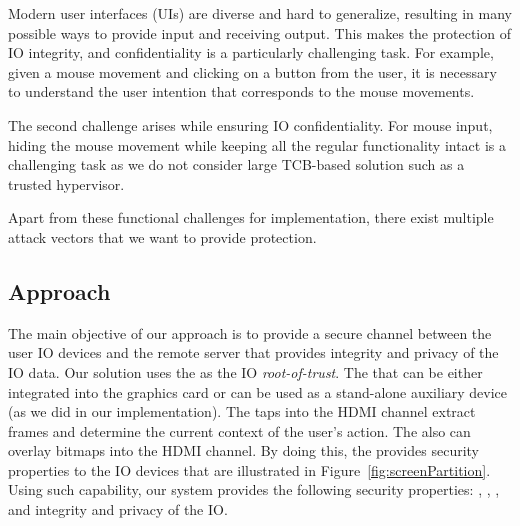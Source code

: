 Modern user interfaces (UIs) are diverse and hard to generalize, resulting in many possible ways to provide input and receiving output.  This makes the protection of IO integrity, and confidentiality is a particularly challenging task. For example, given a mouse movement and clicking on a button from the user, it is necessary to understand the user intention that corresponds to the mouse movements. 

The second challenge arises while ensuring IO confidentiality. For mouse input, hiding the mouse movement while keeping all the regular functionality intact is a challenging task as we do not consider large TCB-based solution such as a trusted hypervisor.


Apart from these functional challenges for implementation, there exist multiple attack vectors that we want to provide protection. 


\iffalse
\subsection{Approach}

The main objective of our approach is to provide a secure channel between the user IO devices and the remote server that provides integrity and privacy of the IO data. Our solution uses the \device as the IO \emph{root-of-trust}. The \device that can be either integrated into the graphics card or can be used as a stand-alone auxiliary device (as we did in our implementation). The \device taps into the HDMI channel extract frames and determine the current context of the user's action. The \device also can overlay bitmaps into the HDMI channel. By doing this, the \device provides security properties to the IO devices that are illustrated in Figure~\ref{fig:screenPartition}. Using such capability, our system provides the following security properties: \emph{\pop}, \emph{\poui}, \emph{\poa}, and integrity and privacy of the IO.

